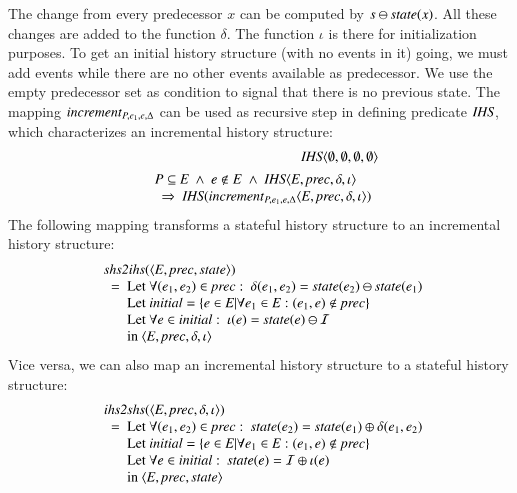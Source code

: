 \documentclass{elsarticle}
\def\id#1{\text{\em #1\/}}
\def\Events{{\mathit E}}
\begin{document}
	The change from every predecessor $x$ can be computed by $s\ominus\id{state}(x)$.
	All these changes are added to the function $\delta$.
	The function $\iota$ is there for initialization purposes.
	To get an initial history structure (with no events in it) going,
	we must add events while there are no other events available as predecessor.
	We use the empty predecessor set as condition to signal that there is no previous state.
	The mapping $\id{increment}_{P,e_1,e,\Delta}$ can be used as recursive step in defining predicate $\id{IHS}$,
	which characterizes an incremental history structure:
\begin{eqnarray}
	&&\id{IHS}\la \emptyset, \emptyset, \emptyset, \emptyset\ra\\
&&\begin{array}{@{}l}
	P\subseteq\Events\ \wedge\ e\notin E\ \wedge\ \id{IHS}\la \Events, \id{prec}, \delta, \iota\ra\\
	\ \ \Rightarrow\ \id{IHS}(\id{increment}_{P,e_1,e,\Delta}\la \Events, \id{prec}, \delta, \iota\ra)
\end{array}
\label{req:recursive def IHS}
\end{eqnarray}
The following mapping transforms a stateful history structure to an incremental history structure:
\begin{eqnarray}
&&\begin{array}{l}
	\id{shs2ihs}(\la\Events, \id{prec}, \id{state}\ra)\\
	\ \ =\ \begin{array}[t]{@{}l}
		\text{Let }\forall(e_1,e_2)\in\id{prec}:\ \delta(e_1,e_2)=\id{state}(e_2)\ominus\id{state}(e_1)\\
		\text{Let }\id{initial}=\{e\in\Events|\forall e_1\in\Events: (e_1,e)\notin\id{prec}\}\\
		\text{Let }\forall e\in\id{initial}:\ \iota(e)=\id{state}(e)\ominus\mathcal I\\
		\text{in }\la\Events, \id{prec}, \delta, \iota\ra
		\end{array}
\end{array}
\label{req:shs2ihs}
\end{eqnarray}
	Vice versa, we can also map an incremental history structure to a stateful history structure:
\begin{eqnarray}
&&\begin{array}{l}
	\id{ihs2shs}(\la\Events, \id{prec}, \delta, \iota\ra)\\
	\ \ =\ \begin{array}[t]{@{}l}
		\text{Let }\forall(e_1,e_2)\in\id{prec}:\ \id{state}(e_2)=\id{state}(e_1)\oplus\delta(e_1,e_2)\\
		\text{Let }\id{initial}=\{e\in\Events|\forall e_1\in\Events: (e_1,e)\notin\id{prec}\}\\
		\text{Let }\forall e\in\id{initial}:\ \id{state}(e)=\mathcal I\oplus\iota(e)\\
		\text{in }\la\Events, \id{prec}, \id{state}\ra
		\end{array}
\end{array}
\label{req:ihs2shs}
\end{eqnarray}
\end{document}
